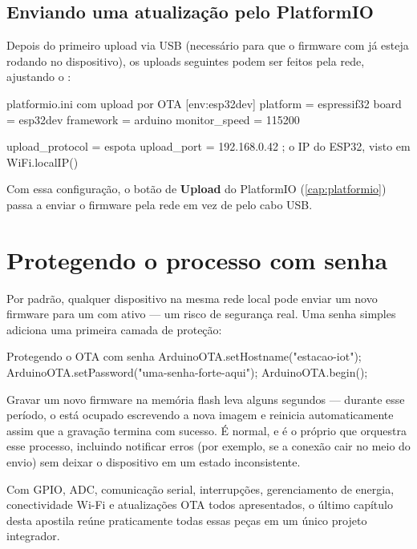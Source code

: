 \subsection{Enviando uma atualização pelo PlatformIO}

Depois do primeiro upload via USB (necessário para que o firmware com  já esteja rodando no dispositivo), os uploads seguintes podem ser feitos pela rede, ajustando o :

\begin{codigoini}{platformio.ini com upload por OTA}
[env:esp32dev]
platform = espressif32
board = esp32dev
framework = arduino
monitor_speed = 115200

upload_protocol = espota
upload_port = 192.168.0.42   ; o IP do ESP32, visto em WiFi.localIP()
\end{codigoini}

Com essa configuração, o botão de \textbf{Upload} do PlatformIO (\cref{cap:platformio}) passa a enviar o firmware pela rede em vez de pelo cabo USB.

\section{Protegendo o processo com senha}

Por padrão, qualquer dispositivo na mesma rede local pode enviar um novo firmware para um \ESP{} com  ativo — um risco de segurança real. Uma senha simples adiciona uma primeira camada de proteção:

\begin{codigoc}{Protegendo o OTA com senha}
ArduinoOTA.setHostname("estacao-iot");
ArduinoOTA.setPassword("uma-senha-forte-aqui");
ArduinoOTA.begin();
\end{codigoc}

\begin{esp32box}
Gravar um novo firmware na memória flash leva alguns segundos — durante esse período, o \ESP{} está ocupado escrevendo a nova imagem e reinicia automaticamente assim que a gravação termina com sucesso. É normal, e é o próprio  que orquestra esse processo, incluindo notificar erros (por exemplo, se a conexão cair no meio do envio) sem deixar o dispositivo em um estado inconsistente.
\end{esp32box}

Com GPIO, ADC, comunicação serial, interrupções, gerenciamento de energia, conectividade Wi-Fi e atualizações OTA todos apresentados, o último capítulo desta apostila reúne praticamente todas essas peças em um único projeto integrador.
